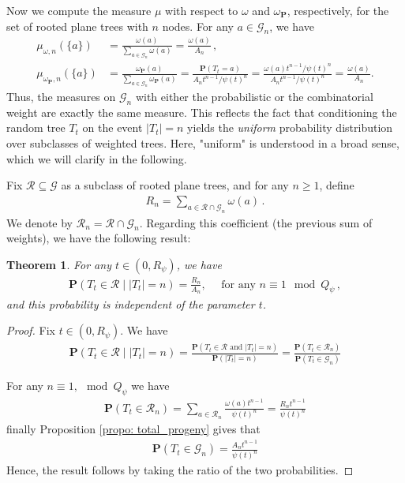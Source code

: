 \documentclass[11pt,a4paper,leqno]{amsart}
\theoremstyle{plain}
\newtheorem{theo}{Theorem}[section]
\theoremstyle{definition}
\numberwithin{equation}{section}
\def\P{\mathbf{P}}
\begin{document}
	
	Now we compute the measure $\mu$ with respect to \( \omega \) and \( \omega_{\P} \), respectively, for the set of rooted plane trees with \( n \) nodes. For any $a \in \mathcal{G}_n$, we have
	\begin{align*}
		\mu_{\omega,n}(\{a\}) &=	\frac{\omega(a)}{\sum_{a \in \mathcal{G}_n}\omega(a)} =  \frac{\omega(a)}{A_n}\,, \\ 
		\mu_{\omega_{\P},n}(\{a\}) &=	\frac{\omega_{\P}(a)}{\sum_{a \in \mathcal{G}_n}\omega_{\P}(a)} = \frac{\P(T_t = a)}{A_n t^{n-1}/\psi(t)^n} 
		= \frac{\omega(a)t^{n-1}/\psi(t)^n}{A_n t^{n-1}/\psi(t)^n} = \frac{\omega(a)}{A_n}.
	\end{align*}
	Thus, the measures on \( \mathcal{G}_n \) with either the probabilistic or the combinatorial weight are exactly the same measure. This reflects the fact that conditioning the random tree \( T_t \) on the event \( |T_t| = n \) yields the \textit{uniform} probability distribution over subclasses of weighted trees. Here, "uniform" is understood in a broad sense, which we will clarify in the following.
	\smallskip
	
	Fix \( \mathcal{R} \subseteq \mathcal{G} \) as a subclass of rooted plane trees, and for any \( n \geq 1 \), define  
	\begin{align*}
		R_n = \sum_{a \in \mathcal{R} \cap \mathcal{G}_n} \omega(a)\,.
	\end{align*}
	We denote by $\mathcal{R}_n = \mathcal{R} \cap \mathcal{G}_n$. Regarding this coefficient (the previous sum of weights), we have the following result:
	\begin{theo}
		For any \( t \in (0,R_{\psi}) \), we have  
		\begin{align*}
			\P(T_t \in \mathcal{R} \mid |T_t| = n) = \frac{R_n}{A_n}, \quad \text{ for any } n \equiv 1 \mod Q_{\psi}\,,
		\end{align*}
		and this probability is independent of the parameter \( t \).
	\end{theo}
	\begin{proof} Fix $t \in (0,R_{\psi})$. We have
		\begin{align*}
			\P(T_t \in \mathcal{R} \mid |T_t| = n) = \frac{\P(T_t \in \mathcal{R} \text{ and } |T_t| = n)}{\P(|T_t| = n)} = \frac{\P(T_t \in \mathcal{R}_n)}{\P(T_t \in \mathcal{G}_n)} 
		\end{align*}
		\smallskip
		
		For any $n \equiv 1, \mod Q_{\psi}$ we have 
		\begin{align*}
			\P(T_t \in \mathcal{R}_n) = \sum_{a \in \mathcal{R}_n}\frac{\omega(a)t^{n-1}}{\psi(t)^n} = \frac{R_n t^{n-1}}{\psi(t)^{n}}
		\end{align*}
		finally Proposition \ref{propo: total_progeny} gives that 
		\begin{align*}
			\P(T_t \in \mathcal{G}_n) = \frac{A_n t^{n-1}}{\psi(t)^n}
		\end{align*}
		Hence, the result follows by taking the ratio of the two probabilities.
	\end{proof}
	
\end{document}
